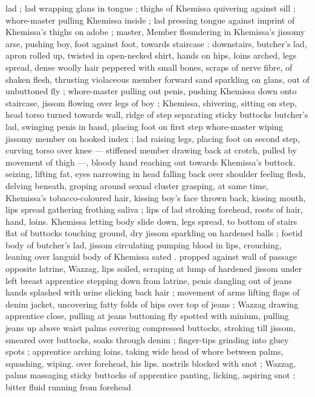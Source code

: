 lad ; lad wrapping glans in tongue ; thighs of Khemissa quivering 
against sill ; whore-master pulling Khemissa inside ; lad pressing 
tongue against imprint of Khemissa's thighs on adobe ; master, 
Member floundering in Khemissa's jissomy arse, pushing boy, foot 
against foot, towards staircase : downstairs, butcher's lad, apron 
rolled up, twisted in open-necked shirt, hands on hips, loins arched, 
legs spread, dense woolly hair peppered with small bones, scraps of 
nerve fibre, of shaken flesh, thrusting violaceous member forward 
sand sparkling on glans, out of unbuttoned fly ; whore-master 
pulling out penis, pushing Khemissa down onto staircase, jissom 
flowing over legs of boy ; Khemissa, shivering, sitting on step, head 
torso turned towards wall, ridge of step separating sticky buttocks 
butcher's lad, swinging penis in hand, placing foot on first step 
whore-master wiping jissomy member on hooked index ; lad raising 
legs, placing foot on second step, curving torso over knee --- 
stiffened member drawing back at crotch, pulled by movement of 
thigh ---, bloody hand reaching out towards Khemissa's buttock. 
seizing, lifting fat, eyes narrowing in head falling back over shoulder 
feeling flesh, delving beneath, groping around sexual cluster 
grasping, at same time, Khemissa's tobacco-coloured hair, kissing 
boy's face thrown back, kissing mouth, lips spread gathering frothing 
saliva ; lips of lad stroking forehead, roots of hair, hand, loins. 
Khemissa letting body slide down, legs spread, to bottom of stairs 
flat of buttocks touching ground, dry jissom sparkling on hardened 
balls ; foetid body of butcher's lad, jissom circulating pumping blood 
in lips, crouching, leaning over languid body of Khemissa sated . 
propped against wall of passage opposite latrine, Wazzag, lips 
soiled, scraping at lump of hardened jissom under left breast 
apprentice stepping down from latrine, penis dangling out of jeans 
hands splashed with urine slicking back hair ; movement of arms 
lifting flaps of denim jacket, uncovering fatty folds of hips over top 
of jeans ; Wazzag drawing apprentice close, pulling at jeans 
buttoning fly spotted with minium, pulling jeans up above waist 
palms covering compressed buttocks, stroking till jissom, smeared 
over buttocks, soaks through denim ; finger-tips grinding into gluey 
spots ; apprentice arching loins, taking wide head of whore between 
palms, squashing, wiping. over forehead, his lips. nostrils blocked 
with snot ; Wazzag, palms massaging sticky buttocks of apprentice 
panting, licking, aspiring snot ; bitter fluid running from forehead 
